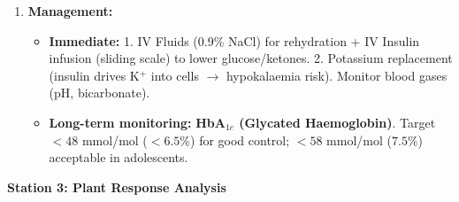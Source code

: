 \documentclass[11pt]{article}
\begin{document}
\begin{enumerate}
\begin{enumerate}
\begin{enumerate}
            \item \textbf{Osmotic diuresis:} Glucose lowers tubular fluid $\Psi_w$ $\rightarrow$ water retained in lumen $\rightarrow$ large volume urine (polyuria).
            \item Volume depletion $\rightarrow$ increased plasma osmolarity $\rightarrow$ hypothalamic osmoreceptors stimulate \textbf{thirst centre} $\rightarrow$ polydipsia. Also ADH released but overwhelmed by osmotic load.
        \end{enumerate}
        \item \textbf{Management:}
        \begin{itemize}
            \item \textbf{Immediate:} 1. IV Fluids (0.9\% NaCl) for rehydration + IV Insulin infusion (sliding scale) to lower glucose/ketones. 2. Potassium replacement (insulin drives K$^+$ into cells $\rightarrow$ hypokalaemia risk). Monitor blood gases (pH, bicarbonate).
            \item \textbf{Long-term monitoring:} \textbf{HbA$_{1c}$ (Glycated Haemoglobin)}. Target $< 48$ mmol/mol ($< 6.5\%$) for good control; $< 58$ mmol/mol ($7.5\%$) acceptable in adolescents.
        \end{itemize}
    \end{enumerate}
\end{enumerate}

\textbf{Station 3: Plant Response Analysis}
\end{document}

